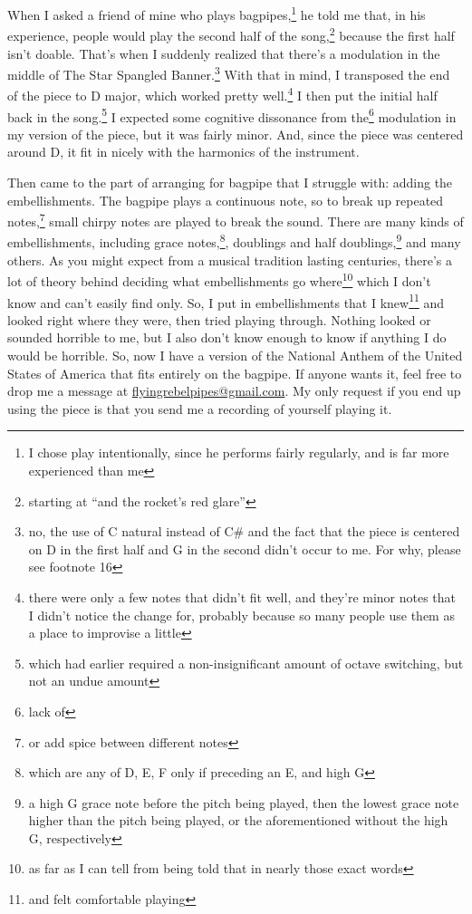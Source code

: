 \documentclass[12pt]{article}[titlepage]
\newcommand{\say}[1]{``#1''}
\newcommand{\1}{\={a}}
\newcommand{\2}{\={e}}
\newcommand{\3}{\={\i}}
\newcommand{\4}{\=o}
\newcommand{\5}{\=u}
\newcommand{\6}{\={A}}
\renewcommand{\,}{\textsuperscript{,}}
\begin{document}
When I asked a friend of mine who plays bagpipes,\footnote{I chose play intentionally, since he performs fairly regularly, and is far more experienced than me} he told me that, in his experience, people would play the second half of the song,\footnote{starting at \say{and the rocket's red glare}} because the first half isn't doable.
That's when I suddenly realized that there's a modulation in the middle of The Star Spangled Banner.\footnote{no, the use of C natural instead of C\# and the fact that the piece is centered on D in the first half and G in the second didn't occur to me. For why, please see footnote 16}
With that in mind, I transposed the end of the piece to D major, which worked pretty well.\footnote{there were only a few notes that didn't fit well, and they're minor notes that I didn't notice the change for, probably because so many people use them as a place to improvise a little}
I then put the initial half back in the song.\footnote{which had earlier required a non-insignificant amount of octave switching, but not an undue amount}
I expected some cognitive dissonance from the\footnote{lack of} modulation in my version of the piece, but it was fairly minor.
And, since the piece was centered around D, it fit in nicely with the harmonics of the instrument.

Then came to the part of arranging for bagpipe that I struggle with: adding the embellishments.
The bagpipe plays a continuous note, so to break up repeated notes,\footnote{or add spice between different notes} small chirpy notes are played to break the sound.
There are many kinds of embellishments, including grace notes,\footnote{which are any of D, E, F only if preceding an E, and high G}, doublings and half doublings,\footnote{a high G grace note before the pitch being played, then the lowest grace note higher than the pitch being played, or the aforementioned without the high G, respectively} and many others.
As you might expect from a musical tradition lasting centuries, there's a lot of theory behind deciding what embellishments go where\footnote{as far as I can tell from being told that in nearly those exact words} which I don't know and can't easily find only.
So, I put in embellishments that I knew\footnote{and felt comfortable playing} and looked right where they were, then tried playing through.
Nothing looked or sounded horrible to me, but I also don't know enough to know if anything I do would be horrible.
So, now I have a version of the National Anthem of the United States of America that fits entirely on the bagpipe.
If anyone wants it, feel free to drop me a message at \href{mailto:flyingrebelpipes@gmail.com}{flyingrebelpipes@gmail.com}.
My only request if you end up using the piece is that you send me a recording of yourself playing it.
\end{document}
